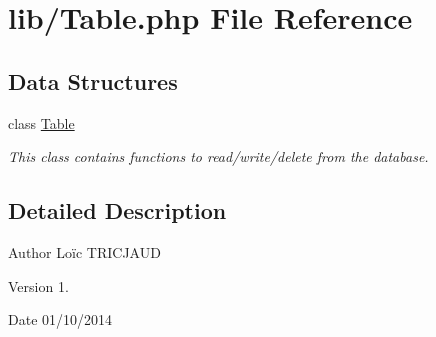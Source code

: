 \hypertarget{_table_8php}{\section{lib/\-Table.php File Reference}
\label{_table_8php}
}
\subsection*{Data Structures}
\begin{DoxyCompactItemize}
\item 
class \hyperlink{class_table}{Table}
\begin{DoxyCompactList}\small\item\em This class contains functions to read/write/delete from the database. \end{DoxyCompactList}\end{DoxyCompactItemize}


\subsection{Detailed Description}
\begin{DoxyAuthor}{Author}
Loïc T\-R\-I\-C\-J\-A\-U\-D 
\end{DoxyAuthor}
\begin{DoxyVersion}{Version}
1. 
\end{DoxyVersion}
\begin{DoxyDate}{Date}
01/10/2014 
\end{DoxyDate}
